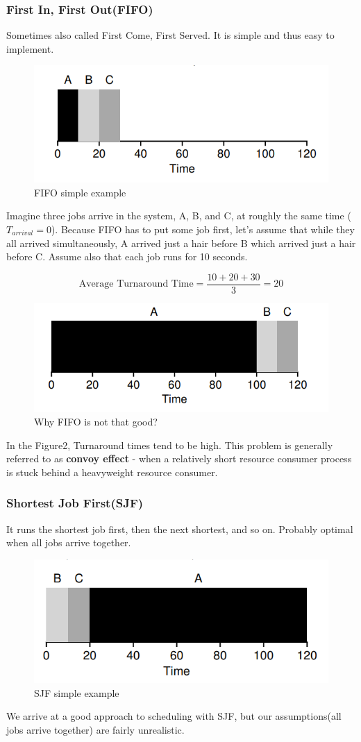 \documentclass{article}
\begin{document}
\subsubsection{First In, First Out(FIFO)}
Sometimes also called First Come, First Served. It is simple and thus easy to implement.
\begin{figure}[H]
        \centering
        \includegraphics[width=0.6\linewidth]{image/fifo1.png}
        \caption{FIFO simple example}
\end{figure}
Imagine three jobs arrive in the system, A, B, and C, at roughly the same time ($T_{arrival} = 0$). Because FIFO has to put some job first, let's assume that while they all arrived simultaneously, A arrived just a hair before B which arrived just a hair before C. Assume also that each job runs for 10 seconds.

$$\text{Average Turnaround Time} = \frac{10 + 20 + 30}{3} = 20$$
\begin{figure}[H]
        \centering
        \includegraphics[width=0.6\linewidth]{image/fifo2.png}
        \caption{Why FIFO is not that good?}
\end{figure}

In the Figure2, Turnaround times tend to be high. This problem is generally referred to as \textbf{convoy effect} - when a relatively short resource consumer process is stuck behind a heavyweight resource consumer.

\subsubsection{Shortest Job First(SJF)}
It runs the shortest job first, then the next shortest, and so on. Probably optimal when all jobs arrive together.

\begin{figure}[H]
        \centering
        \includegraphics[width=0.6\linewidth]{image/sjf1.png}
        \caption{SJF simple example}
\end{figure}
We arrive at a good approach to scheduling with SJF, but our assumptions(all jobs arrive together) are fairly unrealistic.
\end{document}
